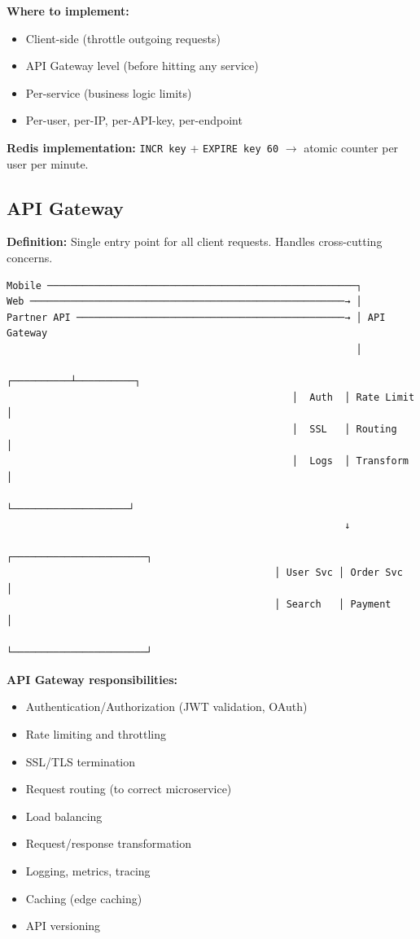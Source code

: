 \documentclass[11pt]{article}
\providecommand{\tightlist}{\setlength{\itemsep}{1pt}\setlength{\parskip}{0pt}}
\begin{document}
\textbf{Where to implement:}

\begin{itemize}
\tightlist
\item
  Client-side (throttle outgoing requests)
\item
  API Gateway level (before hitting any service)
\item
  Per-service (business logic limits)
\item
  Per-user, per-IP, per-API-key, per-endpoint
\end{itemize}

\textbf{Redis implementation:} \texttt{INCR\ key} + \texttt{EXPIRE\ key\ 60} \(\rightarrow\) atomic counter per user per minute.

\subsection{API Gateway}\label{api-gateway}

\textbf{Definition:} Single entry point for all client requests. Handles cross-cutting concerns.

\setcodelang{}

\begin{verbatim}
Mobile ─────────────────────────────────────────────────────┐
Web ──────────────────────────────────────────────────────→ │
Partner API ──────────────────────────────────────────────→ │ API Gateway
                                                            │
                                                 ┌──────────┴──────────┐
                                                 │  Auth  │ Rate Limit │
                                                 │  SSL   │ Routing    │
                                                 │  Logs  │ Transform  │
                                                 └────────────────────┘
                                                          ↓
                                              ┌───────────────────────┐
                                              │ User Svc │ Order Svc  │
                                              │ Search   │ Payment    │
                                              └───────────────────────┘
\end{verbatim}

\textbf{API Gateway responsibilities:}

\begin{itemize}
\tightlist
\item
  Authentication/Authorization (JWT validation, OAuth)
\item
  Rate limiting and throttling
\item
  SSL/TLS termination
\item
  Request routing (to correct microservice)
\item
  Load balancing
\item
  Request/response transformation
\item
  Logging, metrics, tracing
\item
  Caching (edge caching)
\item
  API versioning
\end{itemize}
\end{document}
